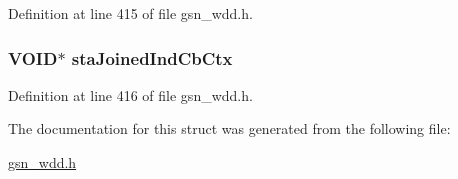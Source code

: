Definition at line 415 of file gsn\_\-wdd.h.

\hypertarget{a00275_a3f1d1116eb48fed0ef506fb7d0b2249d}{
\subsubsection[{staJoinedIndCbCtx}]{\setlength{\rightskip}{0pt plus 5cm}VOID$\ast$ {\bf staJoinedIndCbCtx}}}
\label{a00275_a3f1d1116eb48fed0ef506fb7d0b2249d}


Definition at line 416 of file gsn\_\-wdd.h.



The documentation for this struct was generated from the following file:\begin{DoxyCompactItemize}
\item 
\hyperlink{a00603}{gsn\_\-wdd.h}\end{DoxyCompactItemize}

